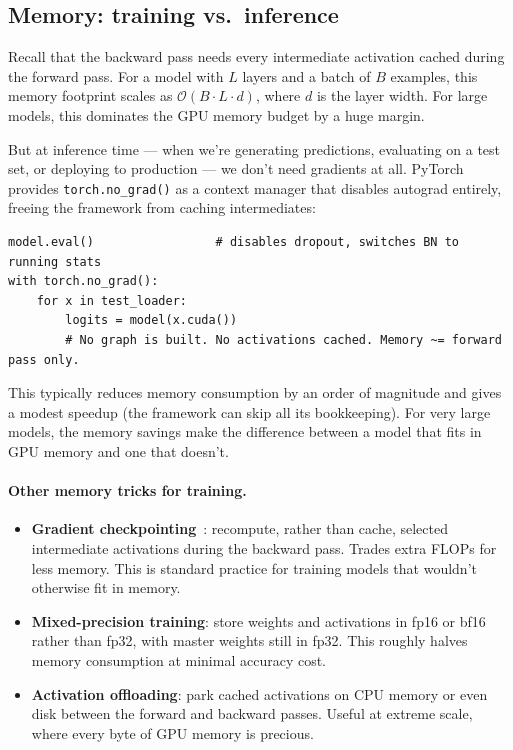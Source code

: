 \documentclass[11pt, a4paper]{article}
\begin{document}
\subsection{Memory: training vs.\ inference}

Recall that the backward pass needs every intermediate activation cached during the forward pass. For a model with $L$ layers and a batch of $B$ examples, this memory footprint scales as $\mathcal{O}(B \cdot L \cdot d)$, where $d$ is the layer width. For large models, this dominates the GPU memory budget by a huge margin.

But at inference time --- when we're generating predictions, evaluating on a test set, or deploying to production --- we don't need gradients at all. PyTorch provides \verb|torch.no_grad()| as a context manager that disables autograd entirely, freeing the framework from caching intermediates:

\begin{lstlisting}
model.eval()                 # disables dropout, switches BN to running stats
with torch.no_grad():
    for x in test_loader:
        logits = model(x.cuda())
        # No graph is built. No activations cached. Memory ~= forward pass only.
\end{lstlisting}

This typically reduces memory consumption by an order of magnitude and gives a modest speedup (the framework can skip all its bookkeeping). For very large models, the memory savings make the difference between a model that fits in GPU memory and one that doesn't.

\paragraph{Other memory tricks for training.}

\begin{itemize}[leftmargin=*]
    \item \textbf{Gradient checkpointing}~\cite{chen2016}: recompute, rather than cache, selected intermediate activations during the backward pass. Trades extra FLOPs for less memory. This is standard practice for training models that wouldn't otherwise fit in memory.
    \item \textbf{Mixed-precision training}: store weights and activations in fp16 or bf16 rather than fp32, with master weights still in fp32. This roughly halves memory consumption at minimal accuracy cost.
    \item \textbf{Activation offloading}: park cached activations on CPU memory or even disk between the forward and backward passes. Useful at extreme scale, where every byte of GPU memory is precious.
\end{itemize}
\end{document}
